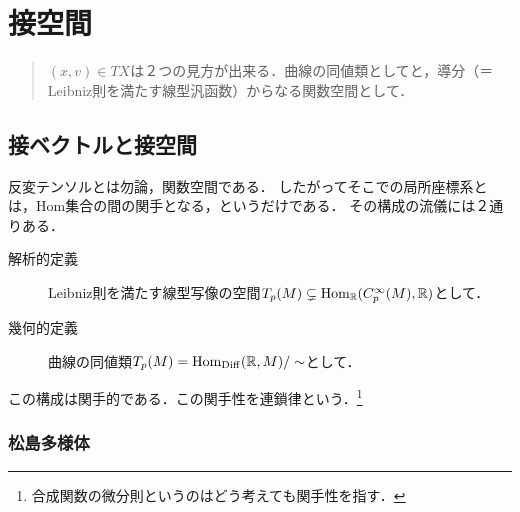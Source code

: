 \documentclass[uplatex,dvipdfmx]{jsreport}
\begin{document}
\section{接空間}

\begin{quote}
    $(x,v)\in TX$は２つの見方が出来る．曲線の同値類としてと，導分（＝Leibniz則を満たす線型汎函数）からなる関数空間として．
\end{quote}

\subsection{接ベクトルと接空間}

\begin{tcolorbox}[colframe=ForestGreen, colback=ForestGreen!10!white,breakable,colbacktitle=ForestGreen!40!white,coltitle=black,fonttitle=\bfseries\sffamily,
    title=一階の反変テンソル]
    反変テンソルとは勿論，関数空間である．
    したがってそこでの局所座標系とは，Hom集合の間の関手となる，というだけである．
    その構成の流儀には２通りある．
    \begin{description}
        \item[解析的定義] Leibniz則を満たす線型写像の空間$T_p(M)\subsetneq\mathrm{Hom}_{\mathbb{R}}(C^\infty_p(M),\mathbb{R})$として．
        \item[幾何的定義] 曲線の同値類$T_p(M)=\mathrm{Hom}_{\mathrm{Diff}}(\mathbb{R},M)/\sim$として．
    \end{description}
    この構成は関手的である．この関手性を連鎖律という．\footnote{合成関数の微分則というのはどう考えても関手性を指す．}
\end{tcolorbox}

\subsubsection{松島多様体}
\end{document}
